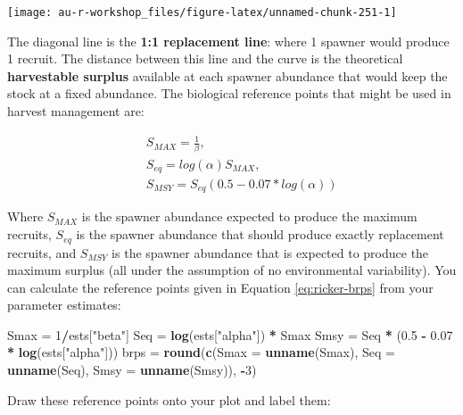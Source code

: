 \documentclass[]{book}
\newenvironment{Shaded}{\begin{snugshade}}{\end{snugshade}}
\newcommand{\KeywordTok}[1]{\textcolor[rgb]{0.13,0.29,0.53}{\textbf{#1}}}
\newcommand{\DataTypeTok}[1]{\textcolor[rgb]{0.13,0.29,0.53}{#1}}
\newcommand{\DecValTok}[1]{\textcolor[rgb]{0.00,0.00,0.81}{#1}}
\newcommand{\FloatTok}[1]{\textcolor[rgb]{0.00,0.00,0.81}{#1}}
\newcommand{\StringTok}[1]{\textcolor[rgb]{0.31,0.60,0.02}{#1}}
\newcommand{\OperatorTok}[1]{\textcolor[rgb]{0.81,0.36,0.00}{\textbf{#1}}}
\newcommand{\NormalTok}[1]{#1}
\theoremstyle{definition}
\theoremstyle{definition}
\theoremstyle{definition}
\theoremstyle{remark}
\begin{document}
\begin{center}\texttt{[image: au-r-workshop\_files/figure-latex/unnamed-chunk-251-1]} \end{center}

The diagonal line is the \textbf{1:1 replacement line}: where 1 spawner
would produce 1 recruit. The distance between this line and the curve is
the theoretical \textbf{harvestable surplus} available at each spawner
abundance that would keep the stock at a fixed abundance. The biological
reference points that might be used in harvest management are:

\begin{eqnarray*}
&& S_{MAX}=\frac{1}{\beta},\\
&& S_{eq}=log(\alpha) S_{MAX},\\
&& S_{MSY}=S_{eq} \left(0.5-0.07*log(\alpha)\right)
\label{eq:ricker-brps}
\end{eqnarray*}

Where \(S_{MAX}\) is the spawner abundance expected to produce the
maximum recruits, \(S_{eq}\) is the spawner abundance that should
produce exactly replacement recruits, and \(S_{MSY}\) is the spawner
abundance that is expected to produce the maximum surplus (all under the
assumption of no environmental variability). You can calculate the
reference points given in Equation \eqref{eq:ricker-brps} from your
parameter estimates:

\begin{Shaded}
\begin{Highlighting}[]
\NormalTok{Smax =}\StringTok{ }\DecValTok{1}\OperatorTok{/}\NormalTok{ests[}\StringTok{"beta"}\NormalTok{]}
\NormalTok{Seq =}\StringTok{ }\KeywordTok{log}\NormalTok{(ests[}\StringTok{"alpha"}\NormalTok{]) }\OperatorTok{*}\StringTok{ }\NormalTok{Smax}
\NormalTok{Smsy =}\StringTok{ }\NormalTok{Seq }\OperatorTok{*}\StringTok{ }\NormalTok{(}\FloatTok{0.5} \OperatorTok{-}\StringTok{ }\FloatTok{0.07} \OperatorTok{*}\StringTok{ }\KeywordTok{log}\NormalTok{(ests[}\StringTok{"alpha"}\NormalTok{]))}
\NormalTok{brps =}\StringTok{ }\KeywordTok{round}\NormalTok{(}\KeywordTok{c}\NormalTok{(}\DataTypeTok{Smax =} \KeywordTok{unname}\NormalTok{(Smax),}
               \DataTypeTok{Seq =} \KeywordTok{unname}\NormalTok{(Seq),}
               \DataTypeTok{Smsy =} \KeywordTok{unname}\NormalTok{(Smsy)), }\OperatorTok{-}\DecValTok{3}\NormalTok{)}
\end{Highlighting}
\end{Shaded}

Draw these reference points onto your plot and label them:
\end{document}

